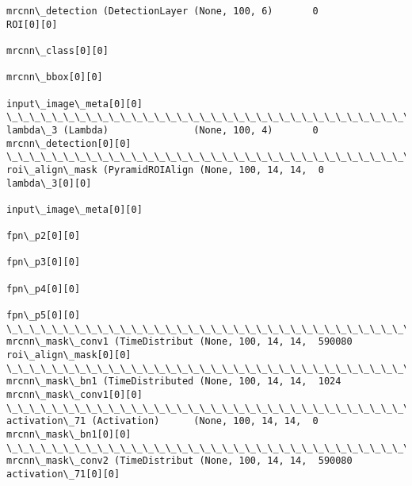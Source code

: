 \documentclass[11pt]{article}
\begin{document}
\begin{Verbatim}[commandchars=\\\{\}]
mrcnn\_detection (DetectionLayer (None, 100, 6)       0           ROI[0][0]                        
                                                                 mrcnn\_class[0][0]                
                                                                 mrcnn\_bbox[0][0]                 
                                                                 input\_image\_meta[0][0]           
\_\_\_\_\_\_\_\_\_\_\_\_\_\_\_\_\_\_\_\_\_\_\_\_\_\_\_\_\_\_\_\_\_\_\_\_\_\_\_\_\_\_\_\_\_\_\_\_\_\_\_\_\_\_\_\_\_\_\_\_\_\_\_\_\_\_\_\_\_\_\_\_\_\_\_\_\_\_\_\_\_\_\_\_\_\_\_\_\_\_\_\_\_\_\_\_\_\_
lambda\_3 (Lambda)               (None, 100, 4)       0           mrcnn\_detection[0][0]            
\_\_\_\_\_\_\_\_\_\_\_\_\_\_\_\_\_\_\_\_\_\_\_\_\_\_\_\_\_\_\_\_\_\_\_\_\_\_\_\_\_\_\_\_\_\_\_\_\_\_\_\_\_\_\_\_\_\_\_\_\_\_\_\_\_\_\_\_\_\_\_\_\_\_\_\_\_\_\_\_\_\_\_\_\_\_\_\_\_\_\_\_\_\_\_\_\_\_
roi\_align\_mask (PyramidROIAlign (None, 100, 14, 14,  0           lambda\_3[0][0]                   
                                                                 input\_image\_meta[0][0]           
                                                                 fpn\_p2[0][0]                     
                                                                 fpn\_p3[0][0]                     
                                                                 fpn\_p4[0][0]                     
                                                                 fpn\_p5[0][0]                     
\_\_\_\_\_\_\_\_\_\_\_\_\_\_\_\_\_\_\_\_\_\_\_\_\_\_\_\_\_\_\_\_\_\_\_\_\_\_\_\_\_\_\_\_\_\_\_\_\_\_\_\_\_\_\_\_\_\_\_\_\_\_\_\_\_\_\_\_\_\_\_\_\_\_\_\_\_\_\_\_\_\_\_\_\_\_\_\_\_\_\_\_\_\_\_\_\_\_
mrcnn\_mask\_conv1 (TimeDistribut (None, 100, 14, 14,  590080      roi\_align\_mask[0][0]             
\_\_\_\_\_\_\_\_\_\_\_\_\_\_\_\_\_\_\_\_\_\_\_\_\_\_\_\_\_\_\_\_\_\_\_\_\_\_\_\_\_\_\_\_\_\_\_\_\_\_\_\_\_\_\_\_\_\_\_\_\_\_\_\_\_\_\_\_\_\_\_\_\_\_\_\_\_\_\_\_\_\_\_\_\_\_\_\_\_\_\_\_\_\_\_\_\_\_
mrcnn\_mask\_bn1 (TimeDistributed (None, 100, 14, 14,  1024        mrcnn\_mask\_conv1[0][0]           
\_\_\_\_\_\_\_\_\_\_\_\_\_\_\_\_\_\_\_\_\_\_\_\_\_\_\_\_\_\_\_\_\_\_\_\_\_\_\_\_\_\_\_\_\_\_\_\_\_\_\_\_\_\_\_\_\_\_\_\_\_\_\_\_\_\_\_\_\_\_\_\_\_\_\_\_\_\_\_\_\_\_\_\_\_\_\_\_\_\_\_\_\_\_\_\_\_\_
activation\_71 (Activation)      (None, 100, 14, 14,  0           mrcnn\_mask\_bn1[0][0]             
\_\_\_\_\_\_\_\_\_\_\_\_\_\_\_\_\_\_\_\_\_\_\_\_\_\_\_\_\_\_\_\_\_\_\_\_\_\_\_\_\_\_\_\_\_\_\_\_\_\_\_\_\_\_\_\_\_\_\_\_\_\_\_\_\_\_\_\_\_\_\_\_\_\_\_\_\_\_\_\_\_\_\_\_\_\_\_\_\_\_\_\_\_\_\_\_\_\_
mrcnn\_mask\_conv2 (TimeDistribut (None, 100, 14, 14,  590080      activation\_71[0][0]              

\end{Verbatim}
\end{document}
